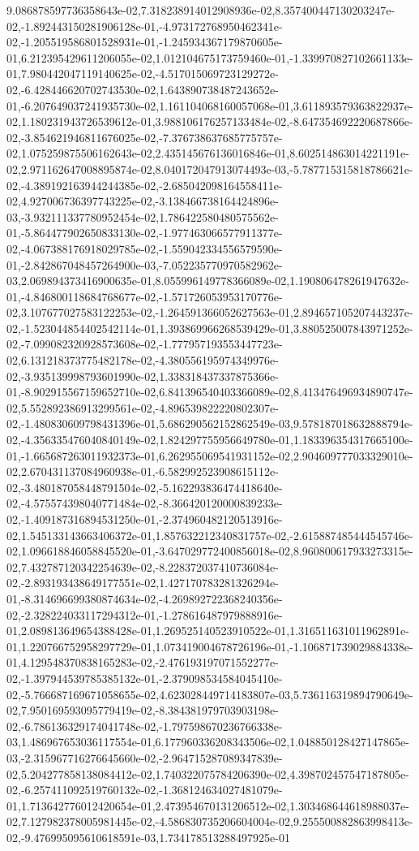 9.086878597736358643e-02,7.318238914012908936e-02,8.357400447130203247e-02,-1.892443150281906128e-01,-4.973172768950462341e-02,-1.205519586801528931e-01,-1.245934367179870605e-01,6.212395429611206055e-02,1.012104675173759460e-01,-1.339970827102661133e-01,7.980442047119140625e-02,-4.517015069723129272e-02,-6.428446620702743530e-02,1.643890738487243652e-01,-6.207649037241935730e-02,1.161104068160057068e-01,3.611893579363822937e-02,1.180231943726539612e-01,3.988106176257133484e-02,-8.647354692220687866e-02,-3.854621946811676025e-02,-7.376738637685775757e-02,1.075259875506162643e-02,2.435145676136016846e-01,8.602514863014221191e-02,2.971162647008895874e-02,8.040172047913074493e-03,-5.787715315818786621e-02,-4.389192163944244385e-02,-2.685042098164558411e-02,4.927006736397743225e-02,-3.138466738164424896e-03,-3.932111337780952454e-02,1.786422580480575562e-01,-5.864477902650833130e-02,-1.977463066577911377e-02,-4.067388176918029785e-02,-1.559042334556579590e-01,-2.842867048457264900e-03,-7.052235770970582962e-03,2.069894373416900635e-01,8.055996149778366089e-02,1.190806478261947632e-01,-4.846800118684768677e-02,-1.571726053953170776e-02,3.107677027583122253e-02,-1.264591366052627563e-01,2.894657105207443237e-02,-1.523044854402542114e-01,1.393869966268539429e-01,3.880525007843971252e-02,-7.099082320928573608e-02,-1.777957193553447723e-02,6.131218373775482178e-02,-4.380556195974349976e-02,-3.935139998793601990e-02,1.338318437337875366e-01,-8.902915567159652710e-02,6.841396540403366089e-02,8.413476496934890747e-02,5.552892386913299561e-02,-4.896539822220802307e-02,-1.480830609798431396e-01,5.686290562152862549e-03,9.578187018632888794e-02,-4.356335476040840149e-02,1.824297755956649780e-01,1.183396354317665100e-01,-1.665687263011932373e-01,6.262955069541931152e-02,2.904609777033329010e-02,2.670431137084960938e-01,-6.582992523908615112e-02,-3.480187058448791504e-02,-5.162293836474418640e-02,-4.575574398040771484e-02,-8.366420120000839233e-02,-1.409187316894531250e-01,-2.374960482120513916e-02,1.545133143663406372e-01,1.857632212340831757e-02,-2.615887485444545746e-02,1.096618846058845520e-01,-3.647029772400856018e-02,8.960800617933273315e-02,7.432787120342254639e-02,-8.228372037410736084e-02,-2.893193438649177551e-02,1.427170783281326294e-01,-8.314696699380874634e-02,-4.269892722368240356e-02,-2.328224033117294312e-01,-1.278616487979888916e-01,2.089813649654388428e-01,1.269525140523910522e-01,1.316511631011962891e-01,1.220766752958297729e-01,1.073419004678726196e-01,-1.106871739029884338e-01,4.129548370838165283e-02,-2.476193197071552277e-02,-1.397944539785385132e-01,-2.379098534584045410e-02,-5.766687169671058655e-02,4.623028449714183807e-03,5.736116319894790649e-02,7.950169593095779419e-02,-8.384381979703903198e-02,-6.786136329174041748e-02,-1.797598670236766338e-03,1.486967653036117554e-01,6.177960336208343506e-02,1.048850128427147865e-03,-2.315967716276645660e-02,-2.964715287089347839e-02,5.204277858138084412e-02,1.740322075784206390e-02,4.398702457547187805e-02,-6.257411092519760132e-02,-1.368124634027481079e-01,1.713642776012420654e-01,2.473954670131206512e-02,1.303468644618988037e-02,7.127982378005981445e-02,-4.586830735206604004e-02,9.255500882863998413e-02,-9.476995095610618591e-03,1.734178513288497925e-01
